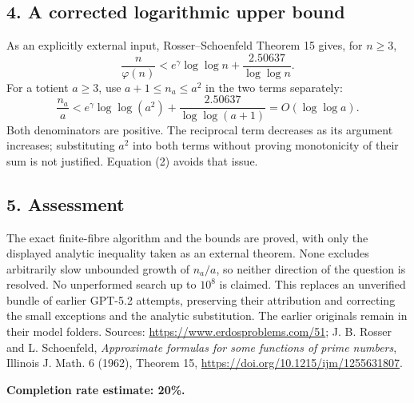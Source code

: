 \subsection*{4. A corrected logarithmic upper bound}
As an explicitly external input, Rosser--Schoenfeld Theorem 15 gives, for $n\ge3$,
\[
 \frac n{\varphi(n)}<e^\gamma\log\log n+\frac{2.50637}{\log\log n}.
\]
For a totient $a\ge3$, use $a+1\le n_a\le a^2$ in the two terms separately:
\[
 \frac{n_a}{a}<e^\gamma\log\log(a^2)
       +\frac{2.50637}{\log\log(a+1)}=O(\log\log a). \tag{2}
\]
Both denominators are positive. The reciprocal term decreases as its argument increases; substituting $a^2$ into both terms without proving monotonicity of their sum is not justified. Equation (2) avoids that issue.

\subsection*{5. Assessment}
The exact finite-fibre algorithm and the bounds are proved, with only the displayed analytic inequality taken as an external theorem. None excludes arbitrarily slow unbounded growth of $n_a/a$, so neither direction of the question is resolved. No unperformed search up to $10^8$ is claimed. This replaces an unverified bundle of earlier GPT-5.2 attempts, preserving their attribution and correcting the small exceptions and the analytic substitution. The earlier originals remain in their model folders.
Sources: \url{https://www.erdosproblems.com/51}; J. B. Rosser and L. Schoenfeld, \emph{Approximate formulas for some functions of prime numbers}, Illinois J. Math. 6 (1962), Theorem 15, \url{https://doi.org/10.1215/ijm/1255631807}.

\textbf{Completion rate estimate: 20\%.}
